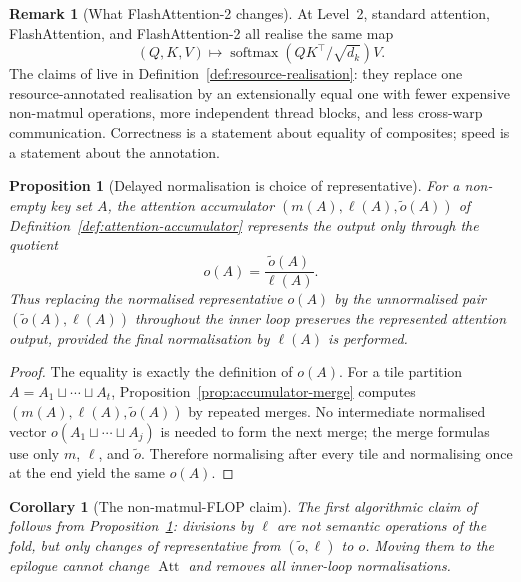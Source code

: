 \documentclass[11pt]{amsart}
\theoremstyle{plain}
\newtheorem{proposition}[theorem]{Proposition}
\newtheorem{corollary}[theorem]{Corollary}
\theoremstyle{definition}
\newtheorem{remark}[theorem]{Remark}
\newcommand{\softmax}{\operatorname{softmax}}
\newcommand{\Att}{\operatorname{Att}}
\begin{document}
\begin{remark}[What FlashAttention-2 changes]
At Level~2, standard attention, FlashAttention, and FlashAttention-2 all
realise the same map
\[
    (Q,K,V) \longmapsto \softmax(QK^\top/\sqrt{d_k})V.
\]
The claims of \cite{Dao2023} live in Definition~\ref{def:resource-realisation}:
they replace one resource-annotated realisation by an extensionally equal one
with fewer expensive non-matmul operations, more independent thread blocks,
and less cross-warp communication.  Correctness is a statement about equality
of composites; speed is a statement about the annotation.
\end{remark}

\begin{proposition}[Delayed normalisation is choice of representative]
\label{prop:delayed-normalisation-representative}
For a non-empty key set $A$, the attention accumulator
$(m(A),\ell(A),\tilde{o}(A))$ of Definition~\ref{def:attention-accumulator}
represents the output only through the quotient
\[
    o(A) = \frac{\tilde{o}(A)}{\ell(A)}.
\]
Thus replacing the normalised representative $o(A)$ by the unnormalised pair
$(\tilde{o}(A),\ell(A))$ throughout the inner loop preserves the represented
attention output, provided the final normalisation by $\ell(A)$ is performed.
\end{proposition}
\begin{proof}
The equality is exactly the definition of $o(A)$.  For a tile partition
$A=A_1\sqcup\cdots\sqcup A_t$, Proposition~\ref{prop:accumulator-merge}
computes $(m(A),\ell(A),\tilde{o}(A))$ by repeated merges.  No intermediate
normalised vector $o(A_1\sqcup\cdots\sqcup A_j)$ is needed to form the next
merge; the merge formulas use only $m$, $\ell$, and $\tilde{o}$.  Therefore
normalising after every tile and normalising once at the end yield the same
$o(A)$.
\end{proof}

\begin{corollary}[The non-matmul-FLOP claim]
\label{cor:nonmatmul-first-principles}
The first algorithmic claim of \cite{Dao2023} follows from
Proposition~\ref{prop:delayed-normalisation-representative}: divisions by
$\ell$ are not semantic operations of the fold, but only changes of
representative from $(\tilde{o},\ell)$ to $o$.  Moving them to the epilogue
cannot change $\Att$ and removes all inner-loop normalisations.
\end{corollary}
\end{document}
